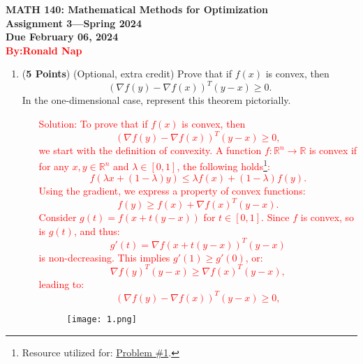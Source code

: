 \documentclass[11pt]{article}
\begin{document}
\pagestyle{empty}

\begin{center}
{\large {\bf MATH 140: Mathematical Methods for Optimization}}\\
{\bf Assignment 3---Spring 2024}\\
{\bf Due February 06, 2024} \\
{\textcolor{red}{\bf By:Ronald Nap}}
\end{center}

\begin{enumerate}

\item ({\bf 5 Points}) (Optional, extra credit) Prove that if $f(x)$
  is convex, then
  $$
  ( \nabla f(y) - \nabla f(x) )^T (y-x) \ge 0.
  $$
  In the one-dimensional case, represent this theorem pictorially.


\begin{enumerate}
    \item[\textcolor{red}{Solution:}] 
    \textcolor{red}{
    To prove that if $f(x)$ is convex, then
    \[
    ( \nabla f(y) - \nabla f(x) )^T (y-x) \ge 0,
    \]
    we start with the definition of convexity. A function $f: \mathbb{R}^n \to \mathbb{R}$ is convex if for any $x, y \in \mathbb{R}^n$ and $\lambda \in [0, 1]$, the following holds\footnote{Resource utilized for: \href{https://www.princeton.edu/~aaa/Public/Teaching/ORF523/S16/ORF523_S16_Lec7_gh.pdf}{Problem \#1}.}:
    \[
    f(\lambda x + (1-\lambda)y) \le \lambda f(x) + (1-\lambda)f(y).
    \]
    Using the gradient, we express a property of convex functions:
    \[
    f(y) \ge f(x) + \nabla f(x)^T(y-x).
    \]
    Consider $g(t) = f(x + t(y-x))$ for $t \in [0,1]$. Since $f$ is convex, so is $g(t)$, and thus:
    \[
    g'(t) = \nabla f(x + t(y-x))^T (y-x)
    \]
    is non-decreasing. This implies $g'(1) \ge g'(0)$, or:
    \[
    \nabla f(y)^T (y-x) \ge \nabla f(x)^T (y-x),
    \]
    leading to:
    \[
    (\nabla f(y) - \nabla f(x))^T (y-x) \ge 0,
    \]
    }

    \begin{figure}[H]
    \centering
    \texttt{[image: 1.png]} 
    \end{figure}

\end{enumerate}




\end{enumerate}
\end{document}

